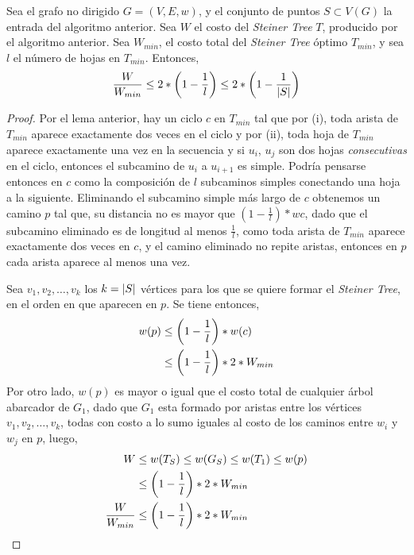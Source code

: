 \documentclass[../np-approximations.tex]{subfiles}
\begin{document}
\begin{theorem}
	Sea el grafo no dirigido $G=(V,E,w)$, y el conjunto de puntos 
	$S\subset V(G)$ la entrada del algoritmo anterior. Sea $W$ el 
	costo del \emph{Steiner Tree} $T$, producido por el algoritmo 
	anterior. Sea $W_{min}$, el costo total del \emph{Steiner Tree} 
	óptimo $T_{min}$, y sea $l$ el número de hojas en $T_{min}$.
	Entonces,
	$$\frac{W}{W_{min}}
	\le 2*\left( 1-\frac{1}{l} \right)
	\le 2*\left( 1-\frac{1}{\left \vert S \right \vert} \right)$$
\end{theorem}

\begin{proof}
	Por el lema anterior, hay un ciclo $c$ en $T_{min}$ tal que por 
	(i), toda arista de $T_{min}$ aparece exactamente dos veces en 
	el ciclo y por (ii), toda hoja de $T_{min}$ aparece exactamente 
	una vez en la secuencia y si $u_i$, $u_j$ son dos hojas
	\emph{consecutivas} en el ciclo, entonces el subcamino de $u_i$ 
	a $u_{i+1}$ es simple. Podría pensarse entonces en $c$ como la 
	composición de $l$ subcaminos simples conectando una hoja a la 
	siguiente. Eliminando el subcamino simple más largo de $c$ 
	obtenemos un camino $p$ tal que, su distancia no es mayor que
	$(1-\frac{1}{l})*w{c}$, dado que el subcamino eliminado es de 
	longitud al menos $\frac{1}{l}$, como toda arista de $T_{min}$ 
	aparece exactamente dos veces en $c$, y el camino eliminado no 
	repite aristas, entonces en $p$ cada arista aparece al menos 
	una vez.
							
	Sea $v_1,v_2,\dots,v_k$ los $k=\left \vert S \right \vert$ vértices para los que 
	se quiere formar el \emph{Steiner Tree}, en el orden en que 
	aparecen en $p$. Se tiene entonces,
	\begin{align*}
		w(p) & \le \left( 1-\frac{1}{l} \right)*w(c)      \\
		     & \le \left( 1-\frac{1}{l} \right)*2*W_{min} 
	\end{align*}
	Por otro lado, $w(p)$ es mayor o igual que el costo total de 
	cualquier árbol abarcador de $G_1$, dado que $G_1$ esta formado 
	por aristas entre los vértices $v_1,v_2,\dots,v_k$, todas con 
	costo a lo sumo iguales al costo de los caminos entre $w_i$ y 
	$w_j$ en $p$, luego,
	\begin{align*}
		W                 & \le w(T_S) 
		\le w(G_S) \le w(T_1) \le w(p) \\
		                  & \le        
		\left( 1-\frac{1}{l} \right)*2*W_{min}  \\
		\frac{W}{W_{min}} & \le        
		\left( 1-\frac{1}{l} \right)*2*W_{min}  \\
	\end{align*}
\end{proof}
\end{document}
